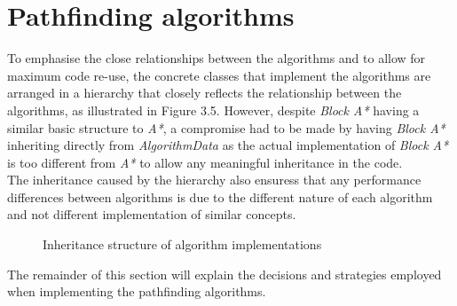 \documentclass[12pt,notitlepage]{report}
\begin{document}
\section{Pathfinding algorithms}
To emphasise the close relationships between the algorithms and to allow for maximum code re-use, the concrete classes that implement the algorithms are arranged in a hierarchy that closely reflects the relationship between the algorithms, as illustrated in Figure 3.5. However, despite {\em Block A*} having a similar basic structure to {\em A*}, a compromise had to be made by having {\em Block A*} inheriting directly from {\em AlgorithmData} as the actual implementation of {\em Block A*} is too different from {\em A*} to allow any meaningful inheritance in the code.\\

\noindent
The inheritance caused by the hierarchy also ensuress that any performance differences between algorithms is due to the different nature of each algorithm and not different implementation of similar concepts.\\

\begin{figure}
\centering
{}
\caption{Inheritance structure of algorithm implementations}
\end{figure}

\noindent
The remainder of this section will explain the decisions and strategies employed when implementing the pathfinding algorithms.
\end{document}
